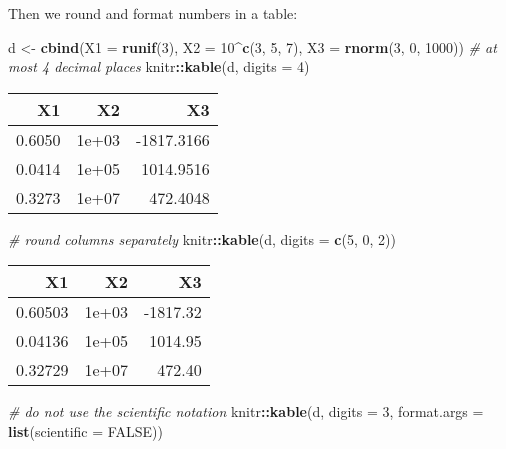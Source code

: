 \documentclass[
  11pt,
]{krantz}
\newenvironment{Shaded}{\begin{snugshade}}{\end{snugshade}}
\newcommand{\CommentTok}[1]{\textcolor[rgb]{0.37,0.37,0.37}{\textit{#1}}}
\newcommand{\DataTypeTok}[1]{\textcolor[rgb]{0.27,0.27,0.27}{#1}}
\newcommand{\DecValTok}[1]{\textcolor[rgb]{0.06,0.06,0.06}{#1}}
\newcommand{\KeywordTok}[1]{\textcolor[rgb]{0.27,0.27,0.27}{\textbf{#1}}}
\newcommand{\NormalTok}[1]{#1}
\newcommand{\OperatorTok}[1]{\textcolor[rgb]{0.43,0.43,0.43}{\textbf{#1}}}
\newcommand{\OtherTok}[1]{\textcolor[rgb]{0.37,0.37,0.37}{#1}}
\newcommand{\StringTok}[1]{\textcolor[rgb]{0.5,0.5,0.5}{#1}}
\begin{document}
Then we round and format numbers in a table:

\begin{Shaded}
\begin{Highlighting}[]
\NormalTok{d <-}\StringTok{ }\KeywordTok{cbind}\NormalTok{(}\DataTypeTok{X1 =} \KeywordTok{runif}\NormalTok{(}\DecValTok{3}\NormalTok{), }\DataTypeTok{X2 =} \DecValTok{10}\OperatorTok{^}\KeywordTok{c}\NormalTok{(}\DecValTok{3}\NormalTok{, }\DecValTok{5}\NormalTok{, }\DecValTok{7}\NormalTok{), }\DataTypeTok{X3 =} \KeywordTok{rnorm}\NormalTok{(}\DecValTok{3}\NormalTok{, }\DecValTok{0}\NormalTok{, }\DecValTok{1000}\NormalTok{))}
\CommentTok{# at most 4 decimal places}
\NormalTok{knitr}\OperatorTok{::}\KeywordTok{kable}\NormalTok{(d, }\DataTypeTok{digits =} \DecValTok{4}\NormalTok{)}
\end{Highlighting}
\end{Shaded}

\begin{tabular}{r|r|r}
\hline
X1 & X2 & X3\\
\hline
0.6050 & 1e+03 & -1817.3166\\
\hline
0.0414 & 1e+05 & 1014.9516\\
\hline
0.3273 & 1e+07 & 472.4048\\
\hline
\end{tabular}

\begin{Shaded}
\begin{Highlighting}[]
\CommentTok{# round columns separately}
\NormalTok{knitr}\OperatorTok{::}\KeywordTok{kable}\NormalTok{(d, }\DataTypeTok{digits =} \KeywordTok{c}\NormalTok{(}\DecValTok{5}\NormalTok{, }\DecValTok{0}\NormalTok{, }\DecValTok{2}\NormalTok{))}
\end{Highlighting}
\end{Shaded}

\begin{tabular}{r|r|r}
\hline
X1 & X2 & X3\\
\hline
0.60503 & 1e+03 & -1817.32\\
\hline
0.04136 & 1e+05 & 1014.95\\
\hline
0.32729 & 1e+07 & 472.40\\
\hline
\end{tabular}

\begin{Shaded}
\begin{Highlighting}[]
\CommentTok{# do not use the scientific notation}
\NormalTok{knitr}\OperatorTok{::}\KeywordTok{kable}\NormalTok{(d, }\DataTypeTok{digits =} \DecValTok{3}\NormalTok{, }\DataTypeTok{format.args =} \KeywordTok{list}\NormalTok{(}\DataTypeTok{scientific =} \OtherTok{FALSE}\NormalTok{))}
\end{Highlighting}
\end{Shaded}
\end{document}
